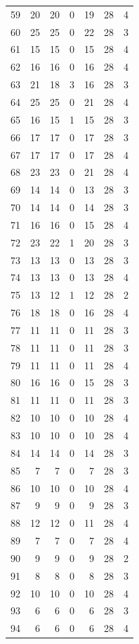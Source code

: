 \documentclass[11pt]{article}
\begin{document}
\begin{center}
\begin{longtable}{r r r r r r r}
59 & 20 & 20 & 0 & 19 & 28 & 4\\
60 & 25 & 25 & 0 & 22 & 28 & 3\\
61 & 15 & 15 & 0 & 15 & 28 & 4\\
62 & 16 & 16 & 0 & 16 & 28 & 4\\
63 & 21 & 18 & 3 & 16 & 28 & 3\\
64 & 25 & 25 & 0 & 21 & 28 & 4\\
65 & 16 & 15 & 1 & 15 & 28 & 3\\
66 & 17 & 17 & 0 & 17 & 28 & 3\\
67 & 17 & 17 & 0 & 17 & 28 & 4\\
68 & 23 & 23 & 0 & 21 & 28 & 4\\
69 & 14 & 14 & 0 & 13 & 28 & 3\\
70 & 14 & 14 & 0 & 14 & 28 & 3\\
71 & 16 & 16 & 0 & 15 & 28 & 4\\
72 & 23 & 22 & 1 & 20 & 28 & 3\\
73 & 13 & 13 & 0 & 13 & 28 & 3\\
74 & 13 & 13 & 0 & 13 & 28 & 4\\
75 & 13 & 12 & 1 & 12 & 28 & 2\\
76 & 18 & 18 & 0 & 16 & 28 & 4\\
77 & 11 & 11 & 0 & 11 & 28 & 3\\
78 & 11 & 11 & 0 & 11 & 28 & 3\\
79 & 11 & 11 & 0 & 11 & 28 & 4\\
80 & 16 & 16 & 0 & 15 & 28 & 3\\
81 & 11 & 11 & 0 & 11 & 28 & 3\\
82 & 10 & 10 & 0 & 10 & 28 & 4\\
83 & 10 & 10 & 0 & 10 & 28 & 4\\
84 & 14 & 14 & 0 & 14 & 28 & 3\\
85 & 7 & 7 & 0 & 7 & 28 & 3\\
86 & 10 & 10 & 0 & 10 & 28 & 4\\
87 & 9 & 9 & 0 & 9 & 28 & 3\\
88 & 12 & 12 & 0 & 11 & 28 & 4\\
89 & 7 & 7 & 0 & 7 & 28 & 4\\
90 & 9 & 9 & 0 & 9 & 28 & 2\\
91 & 8 & 8 & 0 & 8 & 28 & 3\\
92 & 10 & 10 & 0 & 10 & 28 & 4\\
93 & 6 & 6 & 0 & 6 & 28 & 3\\
94 & 6 & 6 & 0 & 6 & 28 & 4\\

\end{longtable}
\end{center}
\end{document}
